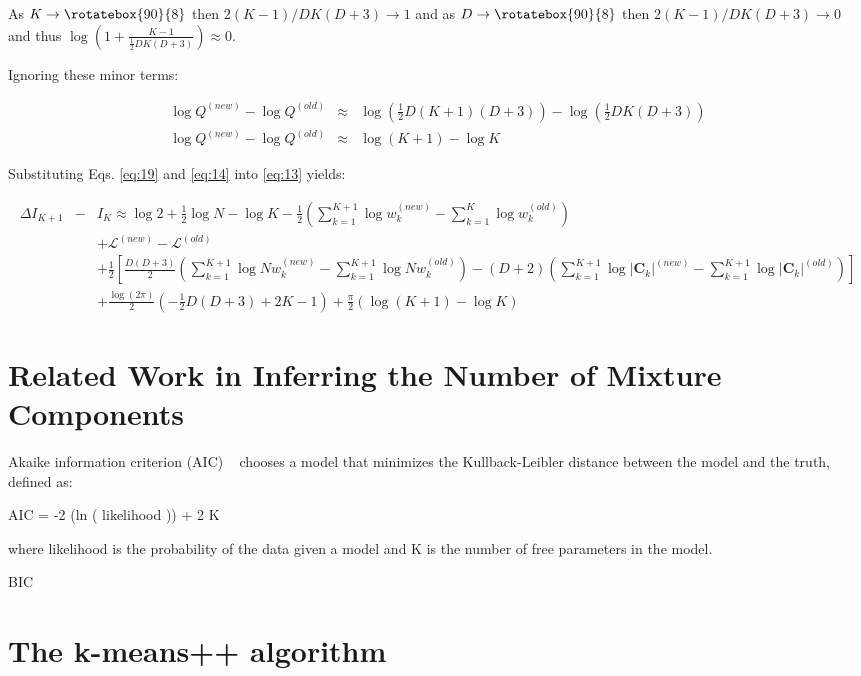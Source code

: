 \documentclass{elsarticle}
\newcommand{\vect}[1]{\boldsymbol{\mathbf{#1}}}
\def\infinity{\rotatebox{90}{8}}
\def\veccov{\vect{C}}
\begin{document}
As $K \rightarrow \infinity$ then $2(K-1)/DK(D+3) \rightarrow 1$ and as $D \rightarrow \infinity$ then $2(K-1)/DK(D+3) \rightarrow 0$ and thus $\log{\left(1 + \frac{K - 1}{\frac{1}{2}DK(D + 3)}\right)} \approx 0$.

\noindent{}Ignoring these minor terms:

\begin{eqnarray}
  \log{Q^{(new)}} - \log{Q^{(old)}} &\approx& \log{\left(\frac{1}{2}D(K+1)(D + 3)\right)} - \log{\left(\frac{1}{2}DK(D + 3)\right)} \nonumber \\
  \log{Q^{(new)}} - \log{Q^{(old)}} &\approx& \log{(K + 1)} - \log{K}
  \label{eq:19}
\end{eqnarray}

\noindent{}Substituting Eqs. \ref{eq:19} and \ref{eq:14} into \ref{eq:13} yields:

\begin{eqnarray}
\Delta{}I_{K+1} &-& I_K \approx \log{2} %
    + \frac{1}{2}\log{N} - \log{K} - \frac{1}{2}\left(\sum_{k=1}^{K+1}\log{w_k^{(new)}} - \sum_{k=1}^{K}\log{w_k^{(old)}}\right) \nonumber \\ %
&& + \mathcal{L}^{(new)} - \mathcal{L}^{(old)} \nonumber \\ %
&& + \frac{1}{2}\left[\frac{D(D+3)}{2}\left(\sum_{k=1}^{K+1}\log{Nw_k^{(new)} - \sum_{k=1}^{K+1}\log{Nw_k^{(old)}}} \right) - \left(D+2\right)\left(\sum_{k=1}^{K+1}\log{|\veccov_k|^{(new)}} - \sum_{k=1}^{K+1}\log{|\veccov_k|^{(old)}}\right)\right] \nonumber \\
&& + \frac{\log(2\pi)}{2}(-\frac{1}{2}D(D+3) + 2K  - 1) + \frac{\pi}{2}\left(\log{(K + 1)} - \log{K}\right)
\end{eqnarray}

\section{Related Work in Inferring the Number of Mixture Components}

Akaike information criterion (AIC) ~\cite{akaike1974} chooses a model that minimizes the Kullback-Leibler distance between the model and the truth, defined as:

AIC = -2 (ln ( likelihood )) + 2 K

where likelihood is the probability of the data given a model and K is the number of free parameters in the model. 

BIC


\section{The k-means++ algorithm}
\end{document}
